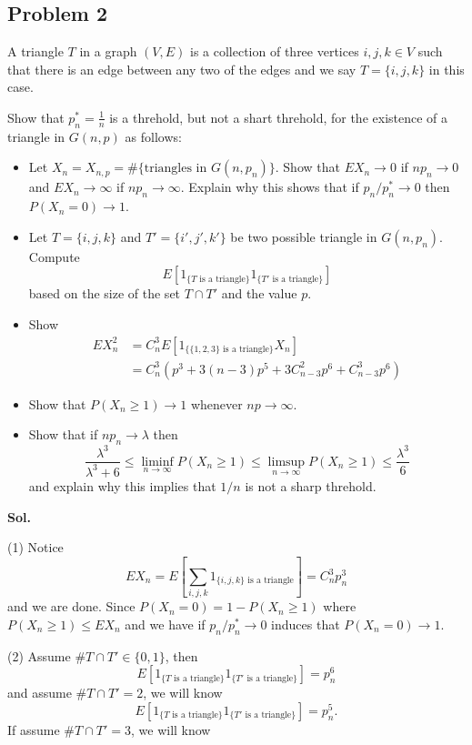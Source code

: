\documentclass[lang=en,11pt,a4paper,citestyle =authoryear]{elegantpaper}
\begin{document}
\subsection*{Problem 2} 
A triangle $T$ in a graph $(V,E)$ is a collection of three vertices $i,j,k\in V$ such that there is an edge between any two of the edges and we say $T=\{i,j,k\}$ in this case.\par
Show that $p^*_n = \tfrac{1}{n}$ is a threhold, but not a shart threhold, for the existence of a triangle in $G(n,p)$ as follows:
\begin{itemize}
    \item Let $X_n = X_{n,p} = \#\{\text{triangles in }G(n,p_n)\}$. Show that $EX_n \to 0$ if $np_n \to 0$ and $EX_n \to \infty$ if $np_n \to \infty$. Explain why this shows that if $p_n/p_n^* \to 0$ then $P(X_n= 0) \to 1$.
    \item Let $T=\{i,j,k\}$ and $T' = \{i',j',k'\}$ be two possible triangle in $G(n,p_n)$. Compute
    \[E[1_{\{T\text{ is a triangle}\}}1_{\{T'\text{ is a triangle}\}}]\]
    based on the size of the set $T\cap T'$ and the value $p$.
    \item Show \[\begin{aligned}EX_n^2 &= C_n^3E[1_{\{\{1,2,3\}\text{ is a triangle}\}}X_n] \\ &= C_n^3(p^3+3(n-3)p^5+3C_{n-3}^2p^6 + C_{n-3}^3p^6)\end{aligned}\]
    \item Show that $P(X_n\geq 1) \to 1$ whenever $np\to\infty$.
    \item Show that if $np_n \to \lambda$ then
    \[\dfrac{\lambda^3}{\lambda^3+6} \leq \liminf_{n\to\infty} P(X_n\geq 1)\leq \limsup_{n\to\infty} P(X_n\geq 1)\leq \dfrac{\lambda^3}{6}\]
    and explain why this implies that $1/n$ is not a sharp threhold.
\end{itemize}
\vspace{0.5em}
\textbf{Sol.} \par
(1) Notice 
\[
EX_n = E\left[\sum\limits_{i,j,k} 1_{\{i,j,k\}\text{ is a triangle}}\right] = C_n^3 p_n^3
\]
and we are done. Since $P(X_n = 0) = 1 - P(X_n \geq 1)$ where $P(X_n \geq 1) \leq E X_n$ and we have if $p_n/p_n^* \to 0$ induces that $P(X_n = 0) \to 1$.\par
(2) Assume $\# T\cap T' \in  \{0,1\}$, then
\[E[1_{\{T\text{ is a triangle}\}}1_{\{T'\text{ is a triangle}\}}] = p_n^6\]
and assume $\# T\cap T' = 2$, we will know
\[E[1_{\{T\text{ is a triangle}\}}1_{\{T'\text{ is a triangle}\}}] = p_n^5.
\]
If assume $\# T\cap T' = 3$, we will know
\end{document}
